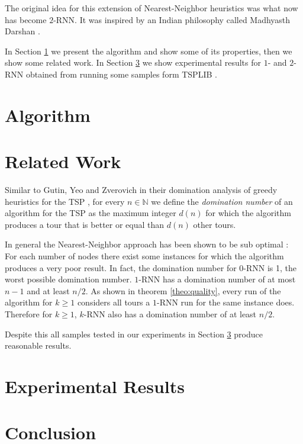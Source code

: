 \documentclass[11pt]{article}
\begin{document}
	The original idea for this extension of Nearest-Neighbor heuristics was what now has become $2$-RNN. It was inspired by an Indian philosophy called Madhyasth Darshan \cite{Nagraj2011, Nagraj2013}. 
	
	In Section \ref{sec:algorithm} we present the algorithm and show some of its properties, then we show some related work. 
	In Section \ref{sec:experimental} we show experimental results for $1$- and $2$-RNN obtained from running some samples form TSPLIB \cite{REINELT1995}.
	 
	\section{Algorithm}
	\label{sec:algorithm}
	
	
	\section{Related Work}
	\label{sec:related}
	
	Similar to Gutin, Yeo and Zverovich in their domination analysis of greedy heuristics for the TSP \cite{GUTIN2002}, for every $n \in \mathbb{N}$ we define the \textit{domination number} of an algorithm for the TSP as the maximum integer $d(n)$ for which the algorithm produces a tour that is better or equal than $d(n)$ other tours.
	 
	
	In general the Nearest-Neighbor approach has been shown to be sub optimal \cite{GUTIN2002}: 
	For each number of nodes there exist some instances for which the algorithm produces a very poor result.
	In fact, the domination number for $0$-RNN is 1, the worst possible domination number.
	$1$-RNN has a domination number of at most $n - 1$ and at least $n / 2$.
	As shown in theorem \ref{theo:quality}, every run of the algorithm for $k \geq 1$ considers all tours a $1$-RNN run for the same instance does.
	Therefore for $k \geq 1$, $k$-RNN also has a domination number of at least $n / 2$.
	
	Despite this all samples tested in our experiments in Section \ref{sec:experimental} produce reasonable results.
	\section{Experimental Results}
	\label{sec:experimental}
	
	

	
	\section{Conclusion}
	\label{sec:conclusion}
	
\end{document}
